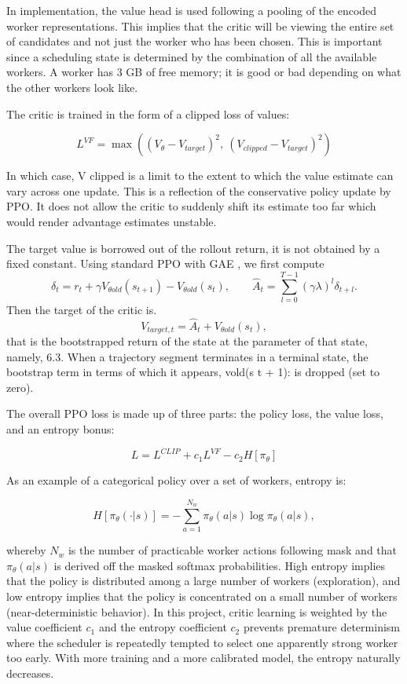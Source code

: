 In implementation, the value head is used following a pooling of the encoded worker representations. This implies that the critic will be viewing the entire set of candidates and not just the worker who has been chosen. This is important since a scheduling state is determined by the combination of all the available workers. A worker has 3 GB of free memory; it is good or bad depending on what the other workers look like.

The critic is trained in the form of a clipped loss of values:

\[
L^{VF} = \max\left((V_\theta - V_{target})^2,\ (V_{clipped} - V_{target})^2\right)
\]

In which case, V clipped is a limit to the extent to which the value estimate can vary across one update. This is a reflection of the conservative policy update by PPO. It does not allow the critic to suddenly shift its estimate too far which would render advantage estimates unstable.

The target value is borrowed out of the rollout return, it is not obtained by a fixed constant. Using standard PPO with GAE \cite{schulman2015gae}, we first compute
\[
\delta_t = r_t + \gamma V_{\theta old}(s_{t+1}) - V_{\theta old}(s_t), \qquad
\hat{A}_t = \sum_{l=0}^{T-1}(\gamma\lambda)^l \delta_{t+l}.
\]
Then the target of the critic is.
\[
V_{target,t} = \hat{A}_t + V_{\theta old}(s_t),
\]
that is the bootstrapped return of the state at the parameter of that state, namely, 6.3. When a trajectory segment terminates in a terminal state, the bootstrap term in terms of which it appears, vold(s t + 1): is dropped (set to zero).

The overall PPO loss is made up of three parts: the policy loss, the value loss, and an entropy bonus:

\[
L = L^{CLIP} + c_1 L^{VF} - c_2 H[\pi_\theta]
\]

As an example of a categorical policy over a set of workers, entropy is:

\[
H[\pi_\theta(\cdot|s)] = -\sum_{a=1}^{N_w}\pi_\theta(a|s)\log\pi_\theta(a|s),
\]

whereby \(N_w\) is the number of practicable worker actions following mask and that \(\pi_\theta(a|s)\) is derived off the masked softmax probabilities. High entropy implies that the policy is distributed among a large number of workers (exploration), and low entropy implies that the policy is concentrated on a small number of workers (near-deterministic behavior). In this project, critic learning is weighted by the value coefficient \(c_1\) and the entropy coefficient \(c_2\) prevents premature determinism where the scheduler is repeatedly tempted to select one apparently strong worker too early. With more training and a more calibrated model, the entropy naturally decreases.

